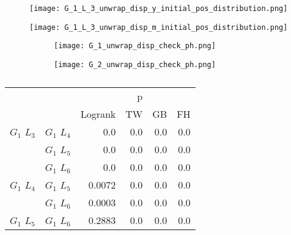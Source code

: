         \begin{figure}
         \centering
         \texttt{[image: G\_1\_L\_3\_unwrap\_disp\_y\_initial\_pos\_distribution.png]}
         \caption{}
         \label{fig:G_1_L_3_disp_yellow_initial_pos_distribution}
        \end{figure}



        \begin{figure}
         \centering
         \texttt{[image: G\_1\_L\_3\_unwrap\_disp\_m\_initial\_pos\_distribution.png]}
         \caption{}
         \label{fig:G_1_L_3_disp_pink_initial_pos_distribution}
        \end{figure}


        

        \begin{figure}
        \centering
        \begin{subfigure}[b]{0.45\textwidth}
          \texttt{[image: G\_1\_unwrap\_disp\_check\_ph.png]}
          \caption{}
          \label{fig:g1_disp_check_ph}
        \end{subfigure}
        \hfill
        \begin{subfigure}[b]{0.45\textwidth}
          \texttt{[image: G\_2\_unwrap\_disp\_check\_ph.png]}
          \caption{}
          \label{fig:g1_disp_check_ph}
        \end{subfigure}
        \caption{}
        \label{fig:branch_disp_check_ph}
      \end{figure}

        
      

      \begin{table}
        \centering
        \begin{tabular}{llrrrr}
          \toprule
                       &             &         &  p &    &     \\
          \cmidrule{3-6}
                       &             & Logrank & TW & GB & FH  \\
          \midrule
          $G_1$ $L_3$  & $G_1$ $L_4$  &  0.0 &  0.0 &  0.0 &  0.0     \\
                       & $G_1$ $L_5$  & 0.0 & 0.0 & 0.0 & 0.0    \\
                       & $G_1$ $L_6$  & 0.0 & 0.0 & 0.0 & 0.0      \\
          $G_1$ $L_4$  & $G_1$ $L_5$  & 0.0072 & 0.0 & 0.0 & 0.0      \\
                       & $G_1$ $L_6$  & 0.0003 & 0.0 & 0.0 & 0.0       \\
          $G_1$ $L_5$   & $G_1$ $L_6$ & 0.2883 &  0.0 & 0.0 & 0.0      \\
          \bottomrule
        \end{tabular}
        \label{tab:g1_ingroup_tests_disp}
        \caption{}
      \end{table}


